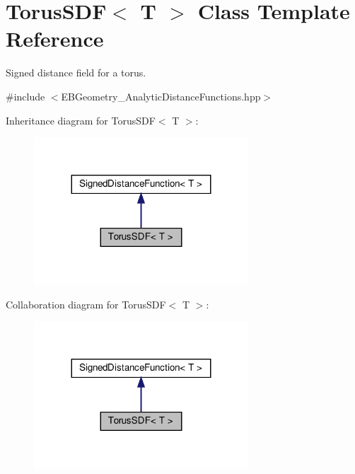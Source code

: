 \hypertarget{classTorusSDF}{}\section{Torus\+S\+DF$<$ T $>$ Class Template Reference}
\label{classTorusSDF}


Signed distance field for a torus.  




{\ttfamily \#include $<$E\+B\+Geometry\+\_\+\+Analytic\+Distance\+Functions.\+hpp$>$}



Inheritance diagram for Torus\+S\+DF$<$ T $>$\+:\nopagebreak
\begin{figure}[H]
\begin{center}
\leavevmode
\includegraphics[width=227pt]{classTorusSDF__inherit__graph}
\end{center}
\end{figure}


Collaboration diagram for Torus\+S\+DF$<$ T $>$\+:\nopagebreak
\begin{figure}[H]
\begin{center}
\leavevmode
\includegraphics[width=227pt]{classTorusSDF__coll__graph}
\end{center}
\end{figure}
